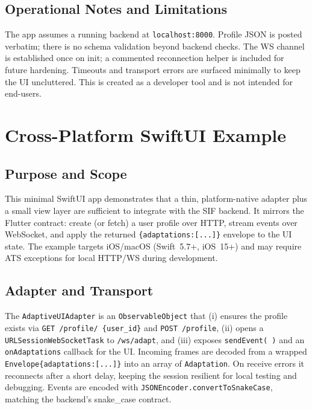 \documentclass[openany]{book}
\begin{document}
\subsection{Operational Notes and Limitations}
The app assumes a running backend at \texttt{localhost:8000}. Profile JSON is posted verbatim; there is no schema validation beyond backend checks. The WS channel is established once on init; a commented reconnection helper is included for future hardening. Timeouts and transport errors are surfaced minimally to keep the UI uncluttered. This is created as a developer tool and is not intended for end-users.

\section{Cross-Platform SwiftUI Example}

\subsection{Purpose and Scope}
This minimal SwiftUI app demonstrates that a thin, platform-native adapter plus a small view layer are sufficient to integrate with the SIF backend. It mirrors the Flutter contract: create (or fetch) a user profile over HTTP, stream events over WebSocket, and apply the returned \texttt{\{adaptations:[...]\}} envelope to the UI state. The example targets iOS/macOS (Swift~5.7+, iOS~15+) and may require ATS exceptions for local HTTP/WS during development.

\subsection{Adapter and Transport}
The \texttt{AdaptiveUIAdapter} is an \texttt{ObservableObject} that (i) ensures the profile exists via \texttt{GET /profile/
\{user\_id\}} and \texttt{POST /profile}, (ii) opens a \texttt{URLSessionWebSocketTask} to \texttt{/ws/adapt}, and (iii) exposes \texttt{sendEvent(\,)} and an \texttt{onAdaptations} callback for the UI. Incoming frames are decoded from a wrapped
 \texttt{Envelope\{adaptations:[...]\}} into an array of \texttt{Adaptation}. On receive errors it reconnects after a short delay, keeping the session resilient for local testing and debugging. Events are encoded with \texttt{JSONEncoder.convertToSnakeCase}, matching the backend’s snake\_case contract.
\end{document}
